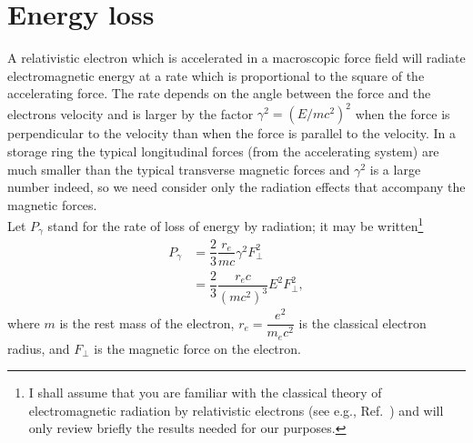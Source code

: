 \documentclass[../sands-adaptation.tex]{subfiles}
\begin{document}
\section{Energy loss}\label{sec:4.1}

A relativistic electron which is accelerated in a macroscopic force field will radiate electromagnetic energy at a rate which is proportional to the square of the accelerating
 force. The rate depends on the angle between the force and the electrons velocity and is larger by the factor $\gamma^2 = (E/mc^2)^2$ when the force is perpendicular to the velocity than when the force is parallel to the velocity. In a storage ring the typical longitudinal forces (from the accelerating system) are much smaller than the typical transverse magnetic forces and $\gamma^2$ is a large number indeed, so we need consider only the radiation effects that accompany the magnetic forces.\\
Let $P_\gamma$ stand for the rate of loss of energy by radiation; it may be written\footnote{I shall assume that you are familiar with the classical theory of electromagnetic radiation by relativistic electrons (see e.g., Ref.~\cite{10}) and will only review briefly the results needed for our purposes.}
\begin{align}
	P_\gamma &= \dfrac{2}{3} \dfrac{r_e}{m c} \gamma^2 F_\perp^2 \nonumber \\
    	&= \dfrac{2}{3} \dfrac{r_e c}{(m c^2)^3} E^2 F_\perp^2,
\end{align}
where $m$ is the rest mass of the electron, $r_e = \dfrac{e^2}{m_e c^2}$ is the classical electron radius, and $F_\perp$ is the magnetic force on the electron.
\end{document}
